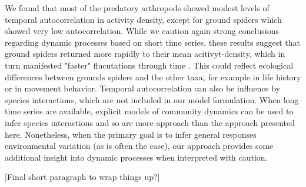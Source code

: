 We found that most of the predatory arthropods showed modest levels of temporal
autocorrelation in activity density,
except for ground spiders which showed very low autocorrelation.
While we caution again strong conclusions regarding dynamic processes based on short
time series,
these results suggest that ground spiders returned more rapidly to their mean
acitivyt-density,
which in turn manifested "faster" flucutations through time \citep{}.
This could reflect ecological differences between grounds spiders and the other taxa,
for example in life history or in movement behavior.
Temporal autocorrelation can also be influence by species interactions,
which are not included in our model formulation.
When long time series are available,
explicit models of community dynamics can be used to infer species interactions
and so are more approach than the approach presented here.
Nonetheless, when the primary goal is to infer general responses environmental variation
(as is often the case),
our approach provides some additional insight into dynamic processes
when interpreted with caution.

[Final short paragraph to wrap things up?]








